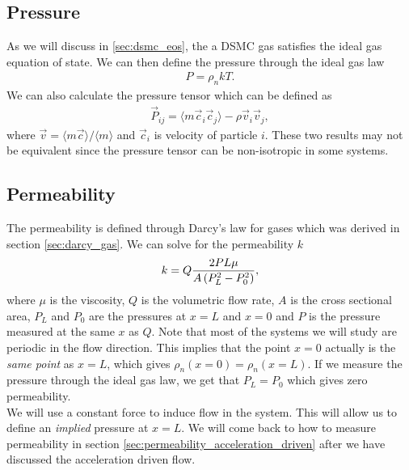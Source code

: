 \subsection{Pressure}
As we will discuss in \ref{sec:dsmc_eos}, the a DSMC gas satisfies the ideal gas equation of state. We can then define the pressure through the ideal gas law
\begin{align}
	P = \rho_n kT.
\end{align}
We can also calculate the pressure tensor which can be defined as \cite{uribe1999burnett}
\begin{align}
	\vec P_{ij} = \langle m\vec c_i \vec c_j \rangle - \rho \vec v_i \vec v_j,
\end{align}
where $\vec v = \langle m\vec c\rangle/\langle m \rangle$ and $\vec c_i$ is velocity of particle $i$. These two results may not be equivalent since the pressure tensor can be non-isotropic in some systems\cite{uribe1999burnett}. 
\subsection{Permeability}
\label{sec:permeability_dsmc}
The permeability is defined through Darcy's law for gases which was derived in section \ref{sec:darcy_gas}. We can solve for the permeability $k$
\begin{align}
	\label{eq:permeability_gas}
	k = Q{2PL\mu\over A\left(P_L^2 - P_0^2\right)},
\end{align}
where $\mu$ is the viscosity, $Q$ is the volumetric flow rate, $A$ is the cross sectional area, $P_L$ and $P_0$ are the pressures at $x=L$ and $x=0$ and $P$ is the pressure measured at the same $x$ as $Q$. Note that most of the systems we will study are periodic in the flow direction. This implies that the point $x=0$ actually is the \textit{same point} as $x=L$, which gives $\rho_n(x=0) = \rho_n(x=L)$. If we measure the pressure through the ideal gas law, we get that $P_L = P_0$ which gives zero permeability.\\
We will use a constant force to induce flow in the system. This will allow us to define an \textit{implied} pressure at $x=L$. We will come back to how to measure permeability in section \ref{sec:permeability_acceleration_driven} after we have discussed the acceleration driven flow.